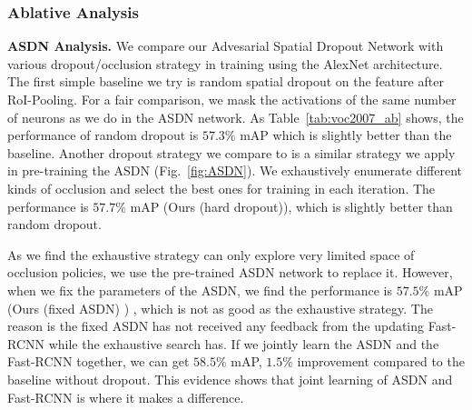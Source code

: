 \subsubsection{Ablative Analysis} 
\vspace{-0.05in}
\textbf{ASDN Analysis.} We compare  our Advesarial Spatial Dropout Network with various dropout/occlusion strategy in training using the AlexNet architecture. The first simple baseline we try is random spatial dropout on the feature after RoI-Pooling. For a fair comparison, we mask the activations of the same number of neurons as we do in the ASDN network. As Table~\ref{tab:voc2007_ab} shows, the performance of random dropout is $57.3\%$ mAP which is slightly better than the baseline. Another dropout strategy we compare to is a similar strategy we apply in pre-training the ASDN (Fig.~\ref{fig:ASDN}). We exhaustively enumerate different kinds of occlusion and select the best ones for training in each iteration. The performance is $57.7\%$ mAP (Ours (hard dropout)), which is slightly better than random dropout. 

As we find the exhaustive strategy can only explore very limited space of occlusion policies, we use the pre-trained ASDN network to replace it. However, when we fix the parameters of the ASDN, we find the performance is $57.5\%$ mAP (Ours (fixed ASDN) ) , which is not as good as the exhaustive strategy. The reason is the fixed ASDN has not received any feedback from the updating Fast-RCNN while the exhaustive search has.  If we jointly learn the ASDN and the Fast-RCNN together, we can get $58.5\%$ mAP, $1.5\%$ improvement compared to the baseline without dropout. This evidence shows that joint learning of ASDN and Fast-RCNN is where it makes a difference. 

